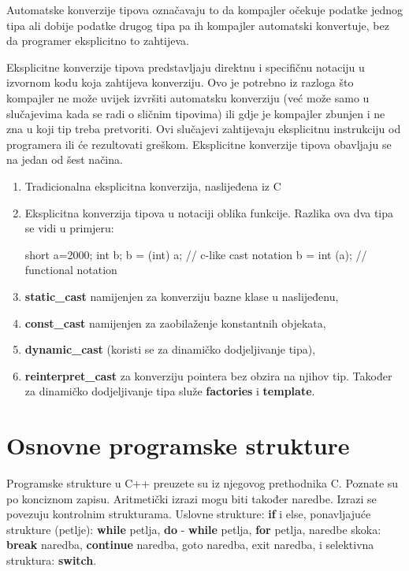 \documentclass[11pt]{book}
\begin{document}
Automatske konverzije tipova označavaju to da kompajler očekuje podatke jednog tipa ali dobije podatke drugog tipa pa ih kompajler automatski konvertuje, bez da programer eksplicitno to zahtijeva.

Eksplicitne konverzije tipova predstavljaju direktnu i specifičnu notaciju u izvornom kodu koja zahtijeva konverziju. Ovo je potrebno iz razloga što kompajler ne može uvijek  izvršiti automatsku konverziju (već može samo u slučajevima kada se radi o sličnim tipovima) ili gdje je kompajler zbunjen i ne zna u koji tip treba pretvoriti. Ovi slučajevi zahtijevaju eksplicitnu instrukciju od programera ili će rezultovati greškom. Eksplicitne konverzije tipova obavljaju se na jedan od šest načina.
\begin{enumerate}
  \item Tradicionalna eksplicitna konverzija, naslijeđena iz C
  \item Eksplicitna konverzija tipova u notaciji oblika funkcije. Razlika ova dva tipa se vidi u primjeru:

        \begin{shortlisting}
          short a=2000;
          int b;
          b = (int) a;    // c-like cast notation
          b = int (a);    // functional notation
        \end{shortlisting}

  \item \textbf{static\_cast} namijenjen za konverziju bazne klase u naslijeđenu,
  \item \textbf{const\_cast} namijenjen za zaobilaženje konstantnih objekata,
  \item \textbf{dynamic\_cast} (koristi se za dinamičko dodjeljivanje tipa),
  \item \textbf{reinterpret\_cast} za konverziju pointera bez obzira na njihov tip. Također za dinamičko dodjeljivanje tipa služe \textbf{factories} i \textbf{template}.
\end{enumerate}

\section{Osnovne programske strukture}

Programske strukture u C++ preuzete su iz njegovog prethodnika C. Poznate su po konciznom zapisu. Aritmetički izrazi mogu biti također naredbe. Izrazi se povezuju kontrolnim strukturama. Uslovne strukture: \textbf{if} i else, ponavljajuće strukture (petlje): \textbf{while} petlja, \textbf{do} - \textbf{while} petlja, \textbf{for} petlja, naredbe skoka: \textbf{break} naredba, \textbf{continue} naredba, goto naredba, exit naredba, i selektivna struktura: \textbf{switch}.
\end{document}
